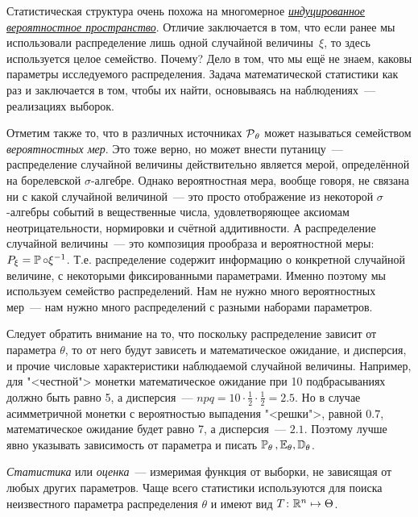 \begin{rmrk}
    Статистическая структура очень похожа на многомерное \hyperlink{induced_prob_space}{\textit{индуцированное вероятностное пространство}}.
    Отличие заключается в том, что если ранее мы использовали распределение лишь одной случайной величины~$\xi$, то здесь используется целое семейство.
    Почему?
    Дело в том, что мы ещё не знаем, каковы параметры исследуемого распределения.
    Задача математической статистики как раз и заключается в том, чтобы их найти, основываясь на наблюдениях~--- реализациях выборок.

    Отметим также то, что в различных источниках $\operatorname{\mathcal{P}}_\theta$ может называться семейством \textit{вероятностных мер}.
    Это тоже верно, но может внести путаницу~--- распределение случайной величины действительно является мерой, определённой на борелевской $\sigma$-алгебре.
    Однако вероятностная мера, вообще говоря, не связана ни с какой случайной величиной~--- это просто отображение из некоторой $\sigma$-алгебры событий в вещественные числа, удовлетворяющее аксиомам неотрицательности, нормировки и счётной аддитивности.
    А распределение случайной величины~--- это композиция прообраза и вероятностной меры: $P_{\xi} = \operatorname{\mathbb{P}} \circ \xi^{-1}$.
    Т.е. распределение содержит информацию о конкретной случайной величине, с некоторыми фиксированными параметрами.
    Именно поэтому мы используем семейство распределений.
    Нам не нужно много вероятностных мер~--- нам нужно много распределений с разными наборами параметров.

    Следует обратить внимание на то, что поскольку распределение зависит от параметра $\theta$, то от него будут зависеть и математическое ожидание, и дисперсия, и прочие числовые характеристики наблюдаемой случайной величины.
    Например, для "<честной"> монетки математическое ожидание при 10 подбрасываниях должно быть равно 5, а дисперсия~--- $npq = 10 \cdot \frac{1}{2} \cdot \frac{1}{2} = 2.5$. 
    Но в случае асимметричной монетки с вероятностью выпадения "<решки">, равной $0.7$, математическое ожидание будет равно 7, а дисперсия~--- $2.1$.
    Поэтому лучше явно указывать зависимость от параметра и писать $\operatorname{\operatorname{\mathbb{P}}_{\theta}}\,, \operatorname{\operatorname{\mathbb{E}}_{\theta}}, \operatorname{\mathbb{D}_{\theta}}$.
\end{rmrk}

\begin{defn}
    \textit{Статистика} или \textit{оценка}~--- измеримая функция от выборки, не зависящая от любых других параметров. Чаще всего статистики используются для поиска неизвестного параметра распределения $\theta$ и имеют вид $T\colon \mathbb{R}^n \mapsto \Theta$.
\end{defn}

